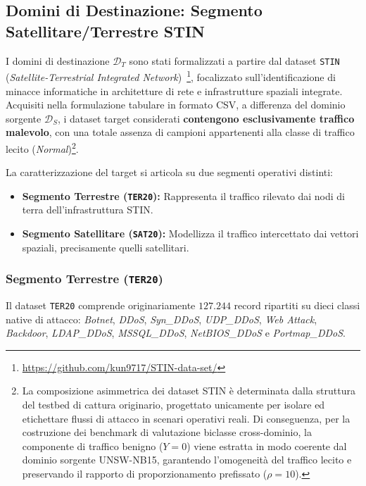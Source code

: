 \subsection{Domini di Destinazione: Segmento Satellitare/Terrestre STIN}
\label{subsec:dataset_target}

I domini di destinazione $\mathcal{D}_T$ sono stati formalizzati a partire dal dataset \texttt{STIN} (\textit{Satellite-Terrestrial Integrated Network})~\cite{stin}\footnote{\url{https://github.com/kun9717/STIN-data-set/}}, focalizzato sull'identificazione di minacce informatiche in architetture di rete e infrastrutture spaziali integrate. 
Acquisiti nella formulazione tabulare in formato CSV, a differenza del dominio sorgente $\mathcal{D}_S$, i dataset target considerati \textbf{contengono esclusivamente traffico malevolo}, con una totale assenza di campioni appartenenti alla classe di traffico lecito (\textit{Normal})\footnote{La composizione asimmetrica dei dataset STIN è determinata dalla struttura del testbed di cattura originario, progettato unicamente per isolare ed etichettare flussi di attacco in scenari operativi reali. Di conseguenza, per la costruzione dei benchmark di valutazione biclasse cross-dominio, la componente di traffico benigno ($Y=0$) viene estratta in modo coerente dal dominio sorgente UNSW-NB15, garantendo l'omogeneità del traffico lecito e preservando il rapporto di proporzionamento prefissato ($\rho = 10$).}.

La caratterizzazione del target si articola su due segmenti operativi distinti:
\begin{itemize}
    \item \textbf{Segmento Terrestre (\texttt{TER20}):} Rappresenta il traffico rilevato dai nodi di terra dell'infrastruttura STIN.
    \item \textbf{Segmento Satellitare (\texttt{SAT20}):} Modellizza il traffico intercettato dai vettori spaziali, precisamente quelli satellitari.
\end{itemize}

\subsubsection{Segmento Terrestre (\texttt{TER20})}
Il dataset \texttt{TER20} comprende originariamente $127.244$ record ripartiti su dieci classi native di attacco: \textit{Botnet}, \textit{DDoS}, \textit{Syn\_DDoS}, \textit{UDP\_DDoS}, \textit{Web Attack}, \textit{Backdoor}, \textit{LDAP\_DDoS}, \textit{MSSQL\_DDoS}, \textit{NetBIOS\_DDoS} e \textit{Portmap\_DDoS}.

